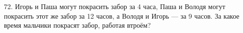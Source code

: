 72. Игорь и Паша могут покрасить забор за 4 часа, Паша и Володя могут покрасить этот же забор за 12 часов, а Володя и Игорь --- за 9 часов. За какое время мальчики покрасят забор, работая втроём?\\

